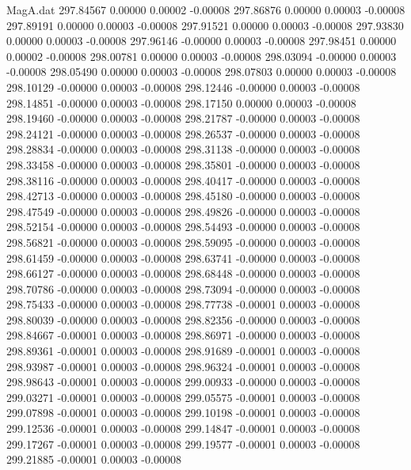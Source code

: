\begin{filecontents}{MagA.dat}
 297.84567    0.00000    0.00002   -0.00008
 297.86876    0.00000    0.00003   -0.00008
 297.89191    0.00000    0.00003   -0.00008
 297.91521    0.00000    0.00003   -0.00008
 297.93830    0.00000    0.00003   -0.00008
 297.96146   -0.00000    0.00003   -0.00008
 297.98451    0.00000    0.00002   -0.00008
 298.00781    0.00000    0.00003   -0.00008
 298.03094   -0.00000    0.00003   -0.00008
 298.05490    0.00000    0.00003   -0.00008
 298.07803    0.00000    0.00003   -0.00008
 298.10129   -0.00000    0.00003   -0.00008
 298.12446   -0.00000    0.00003   -0.00008
 298.14851   -0.00000    0.00003   -0.00008
 298.17150    0.00000    0.00003   -0.00008
 298.19460   -0.00000    0.00003   -0.00008
 298.21787   -0.00000    0.00003   -0.00008
 298.24121   -0.00000    0.00003   -0.00008
 298.26537   -0.00000    0.00003   -0.00008
 298.28834   -0.00000    0.00003   -0.00008
 298.31138   -0.00000    0.00003   -0.00008
 298.33458   -0.00000    0.00003   -0.00008
 298.35801   -0.00000    0.00003   -0.00008
 298.38116   -0.00000    0.00003   -0.00008
 298.40417   -0.00000    0.00003   -0.00008
 298.42713   -0.00000    0.00003   -0.00008
 298.45180   -0.00000    0.00003   -0.00008
 298.47549   -0.00000    0.00003   -0.00008
 298.49826   -0.00000    0.00003   -0.00008
 298.52154   -0.00000    0.00003   -0.00008
 298.54493   -0.00000    0.00003   -0.00008
 298.56821   -0.00000    0.00003   -0.00008
 298.59095   -0.00000    0.00003   -0.00008
 298.61459   -0.00000    0.00003   -0.00008
 298.63741   -0.00000    0.00003   -0.00008
 298.66127   -0.00000    0.00003   -0.00008
 298.68448   -0.00000    0.00003   -0.00008
 298.70786   -0.00000    0.00003   -0.00008
 298.73094   -0.00000    0.00003   -0.00008
 298.75433   -0.00000    0.00003   -0.00008
 298.77738   -0.00001    0.00003   -0.00008
 298.80039   -0.00000    0.00003   -0.00008
 298.82356   -0.00000    0.00003   -0.00008
 298.84667   -0.00001    0.00003   -0.00008
 298.86971   -0.00000    0.00003   -0.00008
 298.89361   -0.00001    0.00003   -0.00008
 298.91689   -0.00001    0.00003   -0.00008
 298.93987   -0.00001    0.00003   -0.00008
 298.96324   -0.00001    0.00003   -0.00008
 298.98643   -0.00001    0.00003   -0.00008
 299.00933   -0.00000    0.00003   -0.00008
 299.03271   -0.00001    0.00003   -0.00008
 299.05575   -0.00001    0.00003   -0.00008
 299.07898   -0.00001    0.00003   -0.00008
 299.10198   -0.00001    0.00003   -0.00008
 299.12536   -0.00001    0.00003   -0.00008
 299.14847   -0.00001    0.00003   -0.00008
 299.17267   -0.00001    0.00003   -0.00008
 299.19577   -0.00001    0.00003   -0.00008
 299.21885   -0.00001    0.00003   -0.00008

\end{filecontents}
